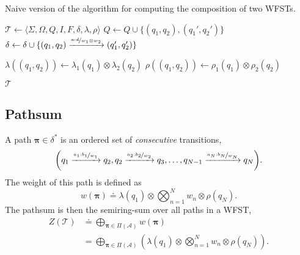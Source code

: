 \begin{algorithm}
    \caption{Naive version of the algorithm for computing the composition of
        two WFSTs.}
    \label{fig:naive-composition}

    \begin{algorithmic}[1]
        \State $\mathcal{T} \gets \langle \Sigma,\Omega,Q,I,F,\delta,\lambda,\rho \rangle$ 
        \State $Q \gets Q \cup \{(q_1,q_2),(q_1',q_2')\}$ 
        \State $\delta \gets \delta \cup \{ (q_1,q_2) \xrightarrow{\nicefrac{a:d}{w_1\otimes w_2}} (q_1',q_2') \}$ 
        \EndIf
        \EndFor
        \EndFor

         
        \State $\lambda((q_1,q_2)) \gets \lambda_1(q_1) \otimes \lambda_2(q_2)$
        \State $\rho((q_1,q_2)) \gets \rho_1(q_1) \otimes \rho_2(q_2)$
        \EndFor

        \State \Return $\mathcal{T}$
        \EndFunction
    \end{algorithmic}
\end{algorithm}

\subsection{Pathsum}

A path $\bm{\pi}\in\delta^*$ is an ordered set of \emph{consecutive}
transitions, \[
    \lft( q_1 \xrightarrow{\nicefrac{a_1:b_1}{w_1}} q_2, q_2 \xrightarrow{\nicefrac{a_2:b_2}{w_2}} q_3,\ldots, q_{N-1} \xrightarrow{\nicefrac{a_N:b_N}{w_N}} q_N \rgt)
    .\]
The weight of this path is defined as \[
    w(\bm{\pi}) \doteq \lambda(q_1) \otimes \bigotimes_{n=1}^N w_n \otimes \rho(q_N)
    .\]
The pathsum is then the semiring-sum over all paths in a WFST,
\begin{align*}
    Z(\mathcal{T}) & \doteq \bigoplus_{\bm{\pi}\in\Pi(\mathcal{A})} w(\bm{\pi})                                                             \\
                   & = \bigoplus_{\bm{\pi}\in\Pi(\mathcal{A})} \left( \lambda(q_1) \otimes \bigotimes_{n=1}^N w_n \otimes \rho(q_N) \right)
    .\end{align*}

